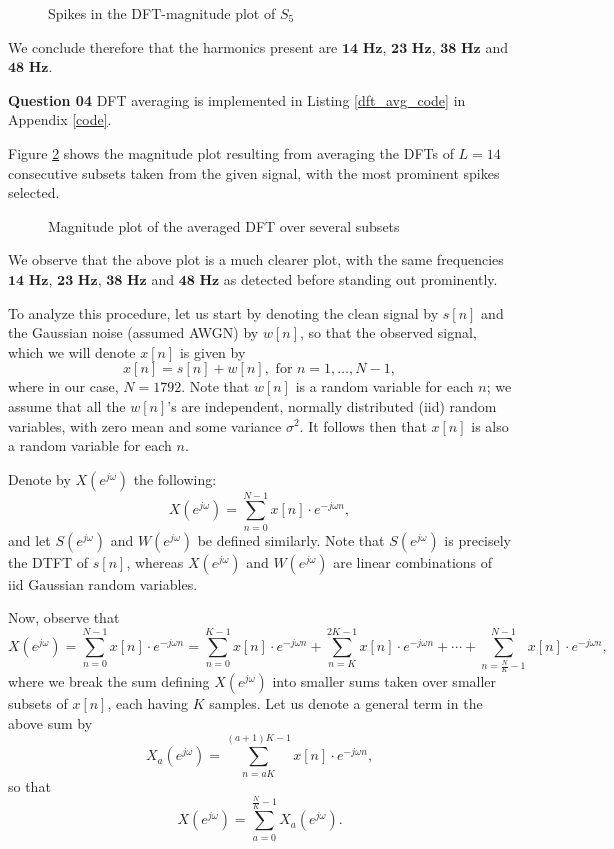 \documentclass{article}[a4paper]
\begin{document}
	\begin{figure}[H]
		\centering
		\caption{Spikes in the DFT-magnitude plot of $S_5$}
		\label{dft_spikes}
	\end{figure}
	
	We conclude therefore that the harmonics present are $\mathbf{14}\textbf{ Hz}$, $\mathbf{23}\textbf{ Hz}$, $\mathbf{38}\textbf{ Hz}$ and $\mathbf{48}\textbf{ Hz}$.
	\medskip
	
	\textbf{Question 04} DFT averaging is implemented in Listing \ref{dft_avg_code} in Appendix \ref{code}.
	
	Figure \ref{avg_dft} shows the magnitude plot resulting from averaging the DFTs of $L = 14$ consecutive subsets taken from the given signal, with the most prominent spikes selected.
	
	\begin{figure}[H]
		\centering
		\caption{Magnitude plot of the averaged DFT over several subsets}
		\label{avg_dft}
	\end{figure}
	
	We observe that the above plot is a much clearer plot, with the same frequencies $\mathbf{14}\textbf{ Hz}$, $\mathbf{23}\textbf{ Hz}$, $\mathbf{38}\textbf{ Hz}$ and $\mathbf{48}\textbf{ Hz}$ as detected before standing out prominently.
	
	To analyze this procedure, let us start by denoting the clean signal by $s[n]$ and the Gaussian noise (assumed AWGN) by $w[n]$, so that the observed signal, which we will denote $x[n]$ is given by \[
		x[n] = s[n] + w[n], \text{ for } n = 1, \dots, N-1,
	\] where in our case, $N = 1792$. Note that $w[n]$ is a random variable for each $n$; we assume that all the $w[n]$'s are independent, normally distributed (iid) random variables, with zero mean and some variance $\sigma^2$. It follows then that $x[n]$ is also a random variable for each $n$.
	
	Denote by $X\left(e^{j\omega}\right)$ the following: \[
		X\left(e^{j\omega}\right)
		=
		\sum_{n=0}^{N-1} x[n] \cdot e^{-j\omega n},
	\] and let $S\left(e^{j\omega}\right)$ and $W\left(e^{j\omega}\right)$ be defined similarly. Note that $S\left(e^{j\omega}\right)$ is precisely the DTFT of $s[n]$, whereas $X\left(e^{j\omega}\right)$ and $W\left(e^{j\omega}\right)$ are linear combinations of iid Gaussian random variables.
	
	Now, observe that \[
		X\left(e^{j\omega}\right)
		=
		\sum_{n=0}^{N-1} x[n] \cdot e^{-j\omega n}
		=
		\sum_{n=0}^{K-1} x[n] \cdot e^{-j\omega n}
		+
		\sum_{n=K}^{2K-1} x[n] \cdot e^{-j\omega n}
		+
		\cdots
		+
		\sum_{n=\frac{N}{K} - 1}^{N-1} x[n] \cdot e^{-j\omega n},
	\] where we break the sum defining $X\left(e^{j\omega}\right)$ into smaller sums taken over smaller subsets of $x[n]$, each having $K$ samples. Let us denote a general term in the above sum by \[
		X_a\left(e^{j\omega}\right)
		=
		\sum_{n=aK}^{(a+1)K-1} x[n] \cdot e^{-j\omega n},
	\] so that \[
		X\left(e^{j\omega}\right)
		=
		\sum_{a=0}^{\frac{N}{K}-1} X_a\left(e^{j\omega}\right).
	\]
	
\end{document}
